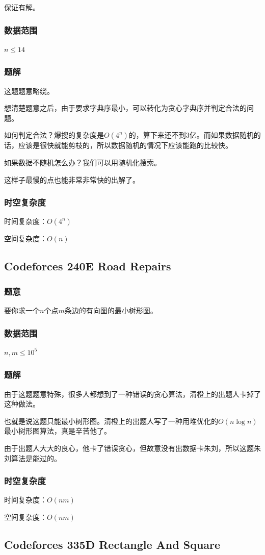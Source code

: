 \documentclass{ctexart}
\begin{document}
保证有解。
\subsubsection{数据范围}
$n \le 14$
\subsubsection{题解}
这题题意略绕。

想清楚题意之后，由于要求字典序最小，可以转化为贪心字典序并判定合法的问题。

如何判定合法？爆搜的复杂度是$O(4^n)$的，算下来还不到$3$亿。而如果数据随机的话，应该是很快就能剪枝的，所以数据随机的情况下应该能跑的比较快。

如果数据不随机怎么办？我们可以用随机化搜索。

这样子最慢的点也能非常非常快的出解了。
\subsubsection{时空复杂度}
时间复杂度：$O(4^n)$

空间复杂度：$O(n)$
\subsection{Codeforces 240E Road Repairs}
\subsubsection{题意}
要你求一个$n$个点$m$条边的有向图的最小树形图。
\subsubsection{数据范围}
$n,m \le 10^5$
\subsubsection{题解}
由于这题题意特殊，很多人都想到了一种错误的贪心算法，清橙上的出题人卡掉了这种做法。

也就是说这题只能最小树形图。清橙上的出题人写了一种用堆优化的$O(n \log n)$最小树形图算法，真是辛苦他了。

由于出题人大大的良心，他卡了错误贪心，但故意没有出数据卡朱刘，所以这题朱刘算法是能过的。
\subsubsection{时空复杂度}
时间复杂度：$O(nm)$

空间复杂度：$O(nm)$
\subsection{Codeforces 335D Rectangle And Square}
\end{document}
